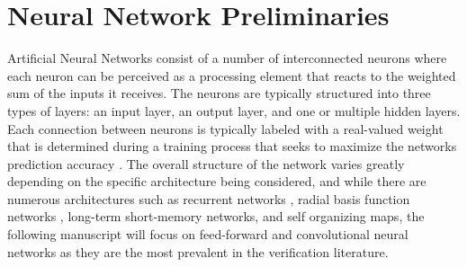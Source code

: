 \documentclass[10pt,conference]{IEEEtran}
\begin{document}
%



\section{Neural Network Preliminaries \label{sec: preliminaries}}
Artificial Neural Networks consist of a number of interconnected neurons where each neuron can be perceived as a processing element that reacts to the weighted sum of the inputs it receives. The neurons are typically structured into three types of layers: an input layer, an output layer, and one or multiple hidden layers. Each connection between neurons is typically labeled with a real-valued weight that is determined during a training process that seeks to maximize the networks prediction accuracy \cite{GlorotTraining2010}. The overall structure of the network varies greatly depending on the specific architecture being considered, and while there are numerous architectures such as recurrent networks \cite{LiptonRecurrentNeural2015}, radial basis function networks \cite{ElanayarRadialBasis1994}, long-term short-memory networks\cite{SeniorLSTM2014}, and self organizing maps\cite{KohonenSOP1990}, the following manuscript will focus on feed-forward and convolutional neural networks as they are the most prevalent in the verification literature.
\end{document}
